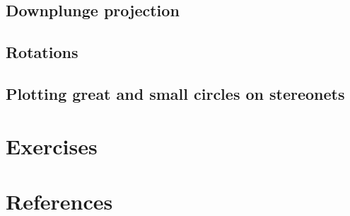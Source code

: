 \documentclass[a4paper , 12pt]{book}
\begin{document}
\subsection{Downplunge projection}

\subsection{Rotations}

\subsection{Plotting great and small circles on stereonets}

\section{Exercises}

\section*{References}
\end{document}
